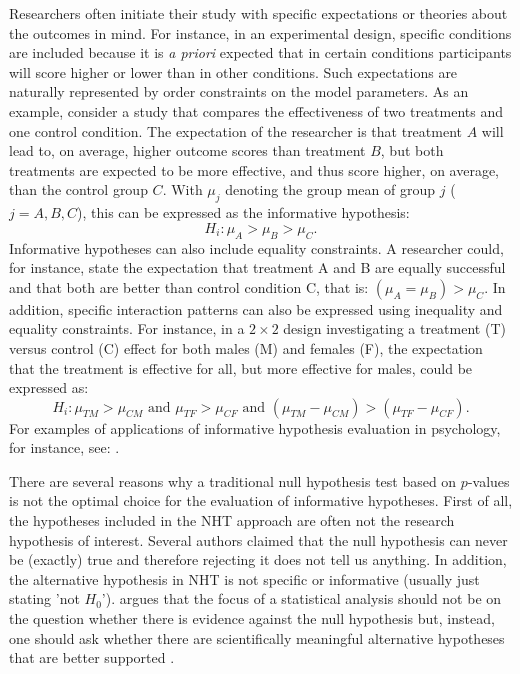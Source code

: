 \documentclass[11pt,reqno]{article}
\begin{document}
Researchers often initiate their study with specific expectations or theories about the outcomes in mind. For instance, in an experimental design, specific conditions are included because it is \emph{a priori} expected that in certain conditions participants will score higher or lower than in other conditions. Such expectations are naturally represented by order constraints on the model parameters. As an example, consider a study that compares the effectiveness of two treatments and one control condition. The expectation of the researcher is that treatment $A$ will lead to, on average, higher outcome scores than treatment $B$, but both treatments are expected to be more effective, and thus score higher, on average, than the control group $C$. With $\mu_j$ denoting the group mean of group $j$ ($j = A, B, C$), this can be expressed as the informative hypothesis:
\[H_i: \mu_A > \mu_B > \mu_C.\]
Informative hypotheses can also include equality constraints. A researcher could, for instance, state the expectation that treatment A and B are equally successful and that both are better than control condition C, that is: $(\mu_A = \mu_B) > \mu_C$. In addition, specific interaction patterns can also be expressed using inequality and equality constraints. For instance, in a $2\times2$ design investigating a treatment (T) versus control (C) effect for both males (M) and females (F), the expectation that the treatment is effective for all, but more effective for males, could be expressed as:
\[H_i: \mu_{TM} > \mu_{CM} \mbox{ and } \mu_{TF} > \mu_{CF} \mbox{ and } (\mu_{TM}-\mu_{CM}) > (\mu_{TF}-\mu_{CF}).\]
For examples of applications of informative hypothesis evaluation in psychology, for instance, see: \textcite{cooper_relationship_2014, bullens_role_2011, vanuijlen_approach_behavior_2017, matthijssen_effects_2019}.


There are several reasons why a traditional null hypothesis test based on $p$-values is not the optimal choice for the evaluation of informative hypotheses. First of all, the hypotheses included in the NHT approach are often not the research hypothesis of interest. Several authors claimed that the null hypothesis can never be (exactly) true \autocite[e.g.,][]{cohen_earth_1994, krueger_null_2001, lykken_wrong_1991} and therefore rejecting it does not tell us anything. In addition, the alternative hypothesis in NHT is not specific or informative (usually just stating 'not $H_0$'). \textcite{royall1997statistical} argues that the focus of a statistical analysis should not be on the question whether there is evidence against the null hypothesis but, instead, one should ask whether there are scientifically meaningful alternative hypotheses that are better supported \autocite[][p. 81]{royall1997statistical}.
\end{document}
